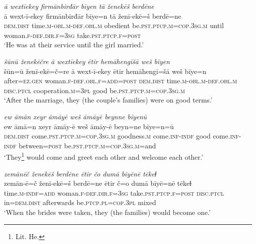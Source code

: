 \ea \label{RE.21}
\textit{ā wextīekey firmānbirđār bīyen tā ženekēš berdēne} \\ 
\gll ā wext-ī-ekey firmānbirđār bīye=n tā ženī-ekē=š berdē=ne \\ 
 \textsc{dem.dist} time\textsc{.m}\textsc{-obl}\textsc{.m}\textsc{-def}\textsc{.obl}\textsc{.m} obedient be\textsc{.pst}\textsc{.ptcp}\textsc{.m}\textsc{=cop}\textsc{.3sg}\textsc{.m} until woman\textsc{.f}\textsc{-def}\textsc{.dir}\textsc{.f}\textsc{=3sg} take\textsc{.pst}\textsc{.ptcp}\textsc{.f}\textsc{=\textsc{post}} \\ 
\glt `He was at their service until the girl married.'
\z 
 
\ea \label{RE.22}
\textit{šūnū ženekēčre ā wextīekey ētir hemāhengīšā weš bīyen} \\ 
\gll šūn=ū ženī-ekē=č=re ā wext-ī-ekey ētir hemāhengī=šā weš bīye=n \\ 
 after\textsc{=ez.gen} woman\textsc{.f}\textsc{-def}\textsc{.obl}\textsc{.f}\textsc{=add}\textsc{=\textsc{post}} \textsc{dem.dist} time\textsc{.m}\textsc{-obl}\textsc{.m}\textsc{-def}\textsc{.obl}\textsc{.m} \textsc{disc.ptcl} cooperation\textsc{.m}\textsc{=3pl} good be\textsc{.pst}\textsc{.ptcp}\textsc{.m}\textsc{=cop}\textsc{.3sg}\textsc{.m} \\ 
\glt `After the marriage, they (the couple's families) were on good terms.'
\z 
 
\ea \label{RE.25}
\textit{ew āmān xeyr āmāyē weš āmāyē beynne bīyenū} \\ 
\gll ew āmā=n xeyr āmāy-ē weš āmāy-ē beyn=ne bīye=n=ū \\ 
 \textsc{dem.dist} come\textsc{.pst}\textsc{.ptcp}\textsc{.m}\textsc{=cop}\textsc{.3sg}\textsc{.m} goodness\textsc{.m} come\textsc{.inf}\textsc{-indf} good come\textsc{.inf}\textsc{-indf} between\textsc{=\textsc{post}} be\textsc{.pst}\textsc{.ptcp}\textsc{.m}\textsc{=cop}\textsc{.3sg}\textsc{.m}=and \\ 
\glt `They\footnote{Lit. He.} would come and greet each other and welcome each other.'
\z 
 
\ea \label{RE.26}
\textit{zemānēč ženekēš berdēne ētir čo dumā bīyēnē tēkeɫ} \\ 
\gll zemān-ē=č ženī-ekē=š berdē=ne ētir č=o dumā bīyē=nē tēkeɫ \\ 
 time\textsc{.m}\textsc{-indf}\textsc{=add} woman\textsc{.f}\textsc{-def}\textsc{.dir}\textsc{.f}\textsc{=3sg} take\textsc{.pst}\textsc{.ptcp}\textsc{.f}\textsc{=\textsc{post}} \textsc{disc.ptcl} in=\textsc{dem.dist} afterwards be\textsc{.ptcp}\textsc{.pl}\textsc{=cop}\textsc{.3pl} mixed \\ 
\glt `When the brides were taken, they (the families) would become one.'
\z 
 
